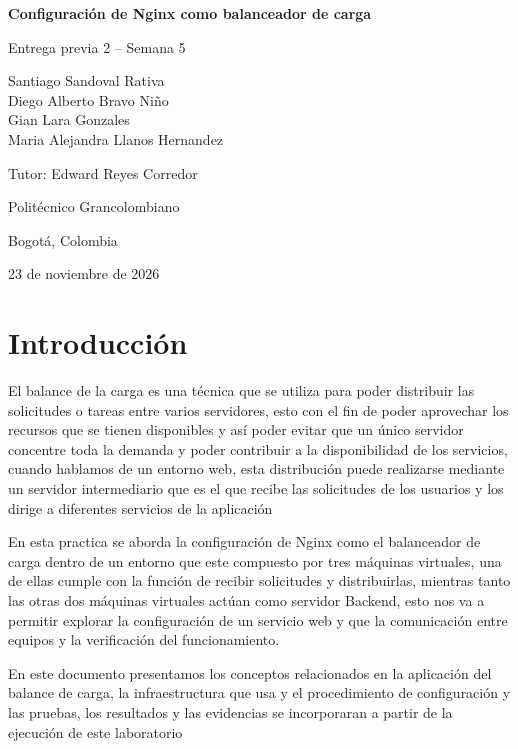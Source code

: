 \documentclass[12pt,letterpaper]{article}
\newcommand{\universidad}{Politécnico Grancolombiano}
\newcommand{\titulo}{Configuración de Nginx como balanceador de carga}
\newcommand{\integrantes}{%
Santiago Sandoval Rativa\\
Diego Alberto Bravo Niño\\
Gian Lara Gonzales\\
Maria Alejandra Llanos Hernandez}
\newcommand{\docente}{Edward Reyes Corredor}
\newcommand{\fechaentrega}{23 de noviembre de 2026}
\begin{document}
\begin{titlepage}
\centering
{\large\bfseries \titulo\par}
\vspace{1.5cm}
{\large Entrega previa 2 -- Semana 5\par}
\vspace{2cm}
{\large \integrantes\par}
\vspace{0.5cm}
{\large Tutor: \docente\par}
\vfill
{\large \universidad\par}
\vspace{2cm}
{\large Bogotá, Colombia\par}
{\large \fechaentrega\par}
\end{titlepage}

\begin{singlespace}
\tableofcontents
\end{singlespace}

\section{Introducción}
El balance de la carga es una técnica que se utiliza para poder distribuir las solicitudes o tareas entre varios servidores, esto con el fin de poder aprovechar los recursos que se tienen disponibles y así poder evitar que un único servidor concentre toda la demanda y poder contribuir a la disponibilidad de los servicios, cuando hablamos de un entorno web, esta distribución puede realizarse mediante un servidor intermediario que es el que recibe las solicitudes de los usuarios y los dirige a diferentes servicios de la aplicación 

En esta practica se aborda la configuración de Nginx como el balanceador de carga dentro de un entorno que este compuesto por tres máquinas virtuales, una de ellas cumple con la función de recibir solicitudes y distribuirlas, mientras tanto las otras dos máquinas virtuales actúan como servidor Backend, esto nos va a permitir explorar la configuración de un servicio web y que la comunicación entre equipos y la verificación del funcionamiento.

En este documento presentamos los conceptos relacionados en la aplicación del balance de carga, la infraestructura que usa y el procedimiento de configuración y las pruebas, los resultados y las evidencias se incorporaran a partir de la ejecución de este laboratorio
\end{document}
